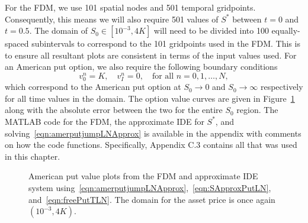 For the FDM, we use 101 spatial nodes and 501 temporal gridpoints. Consequently, this means we will also require 501 values of $S^*$ between $t=0$ and $t=0.5$. The domain of $S_0 \in [10^{-3},4K]$ will need to be divided into 100 equally-spaced subintervals to correspond to the 101 gridpoints used in the FDM. This is to ensure all resultant plots are consistent in terms of the input values used. For an American put option, we also require the following boundary conditions
	$$
		v_0^n = K, \quad v_I^n = 0, \quad \text{for all } n = 0,1,\ldots,N,
	$$
which correspond to the American put option at $S_0 \rightarrow 0$ and $S_0 \rightarrow \infty$ respectively for all time values in the domain. The option value curves are given in Figure~\ref{fig:amerputPlot} along with the absolute error between the two for the entire $S_0$ region. The MATLAB code for the FDM, the approximate IDE for $S^*$, and solving~\eqref{eqn:amerputjumpLNApprox} is available in the appendix with comments on how the code functions. Specifically, Appendix C.3 contains all that was used in this chapter.
	\begin{figure}[!h]
		\centering
		\caption{American put value plots from the FDM and approximate IDE system using~\eqref{eqn:amerputjumpLNApprox},~\eqref{eqn:SApproxPutLN}, and~\eqref{eqn:freePutTLN}. The domain for the asset price is once again $(10^{-3},4K)$.}
		\label{fig:amerputPlot}
\end{figure}
 
